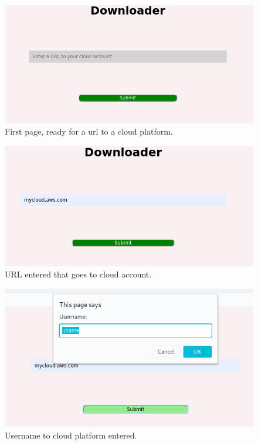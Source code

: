 \documentclass{article}
\title{}
\author{}
\date{}
\begin{document}
    

    \listoffigures

    \newpage

    \begin{figure}[h]
    \includegraphics[scale=.7]{s0}
        \caption{First page, ready for a url to a cloud platform.}
    \end{figure}

    \begin{figure}[h]
    \includegraphics[scale=.7]{s1}
        \caption{URL entered that goes to cloud account.}
    \end{figure}

    \begin{figure}[h]
    \includegraphics[scale=.7]{s2}
        \caption{Username to cloud platform entered.}
    \end{figure}
\end{document}
